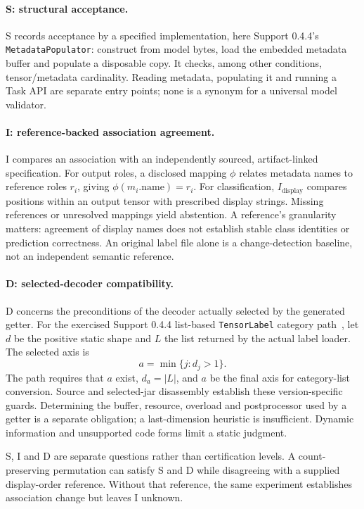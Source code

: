 \documentclass[10pt,twocolumn,letterpaper]{article}
\newcommand{\code}[1]{\texttt{#1}}
\begin{document}
\paragraph{S: structural acceptance.}
S records acceptance by a specified implementation, here Support 0.4.4's \code{MetadataPopulator}: construct from model bytes, load the embedded metadata buffer and populate a disposable copy. It checks, among other conditions, tensor/metadata cardinality. Reading metadata, populating it and running a Task API are separate entry points; none is a synonym for a universal model validator.

\paragraph{I: reference-backed association agreement.}
I compares an association with an independently sourced, artifact-linked specification. For output roles, a disclosed mapping $\phi$ relates metadata names to reference roles $r_i$, giving $\phi(m_i.\mathrm{name})=r_i$. For classification, $I_{\mathrm{display}}$ compares positions within an output tensor with prescribed display strings. Missing references or unresolved mappings yield abstention. A reference's granularity matters: agreement of display names does not establish stable class identities or prediction correctness. An original label file alone is a change-detection baseline, not an independent semantic reference.

\paragraph{D: selected-decoder compatibility.}
D concerns the preconditions of the decoder actually selected by the generated getter. For the exercised Support 0.4.4 list-based \code{TensorLabel} category path~\cite{tensorlabel}, let $d$ be the positive static shape and $L$ the list returned by the actual label loader. The selected axis is
\begin{equation}
a=\min\{j:d_j>1\}.
\end{equation}
The path requires that $a$ exist, $d_a=|L|$, and $a$ be the final axis for category-list conversion. Source and selected-jar disassembly establish these version-specific guards. Determining the buffer, resource, overload and postprocessor used by a getter is a separate obligation; a last-dimension heuristic is insufficient. Dynamic information and unsupported code forms limit a static judgment.

S, I and D are separate questions rather than certification levels. A count-preserving permutation can satisfy S and D while disagreeing with a supplied display-order reference. Without that reference, the same experiment establishes association change but leaves I unknown.
\end{document}
